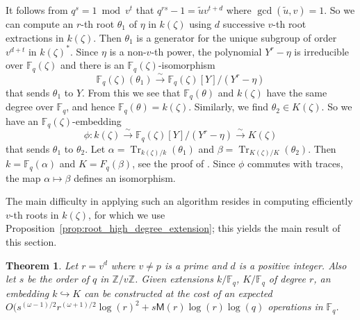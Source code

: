 \documentclass{mcom-l}
\theoremstyle{plain}
\newtheorem{theorem}{Theorem}
\theoremstyle{definition}
\DeclareMathOperator{\trace}{Tr} %
\newcommand{\Z}{\ensuremath{\mathbb{Z}}}
\newcommand{\F}{\ensuremath{\mathbb{F}}}
\newcommand{\MM}{\ensuremath{\mathsf{M}}}
\newcounter{algorithm}
\begin{document}
It follows from $q^s = 1 \bmod v^t$ that $q^{rs} - 1 = \tilde{u}v^{t + d}$ where $\gcd(\tilde{u}, 
v) = 1$. So we can compute an $r$-th root $\theta_1$ of $\eta$ in $k(\zeta)$ using $d$ successive 
$v$-th root extractions in $k(\zeta)$. Then $\theta_1$ is a generator for the unique subgroup of 
order $v^{d + t}$ in $k(\zeta)^*$. Since $\eta$ is a non-$v$-th power, the polynomial $Y^r - \eta$ 
is irreducible over $\F_q(\zeta)$ and there is an $\F_q(\zeta)$-isomorphism 
\[ \F_q(\zeta)(\theta_1) \xrightarrow{\sim} \F_q(\zeta)[Y] / (Y^r - \eta) \]
that sends $\theta_1$ to $Y$. From this we see that $\F_q(\theta)$ and $k(\zeta)$ have the same 
degree over $\F_q$, and hence $\F_q(\theta) = k(\zeta)$. Similarly, we find $\theta_2 \in 
K(\zeta)$. So we have an $\F_q(\zeta)$-embedding
\[ \phi: k(\zeta) \xrightarrow{\sim} \F_q(\zeta)[Y] / (Y^r - \eta) \xrightarrow{\sim} K(\zeta) \]
that sends $\theta_1$ to $\theta_2$. Let $\alpha = \trace_{k(\zeta) / k}(\theta_1)$ and $\beta = 
\trace_{K(\zeta) / K}(\theta_2)$. Then $k = \F_q(\alpha)$ and $K = F_q(\beta)$, see the proof of 
\cite[Theorem 2.1]{Shoup90}. Since $\phi$ commutes with traces, the map $\alpha\mapsto\beta$ 
defines an isomorphism.

The main difficulty in applying such an algorithm resides in computing
efficiently $v$-th roots in $k(\zeta)$, for which we use Proposition~\ref{prop:root_high_degree_extension};
this yields the main result of this section.
\begin{theorem}
	\label{theorem:isom-root}
	Let $r = v^d$ where $v \ne p$ is a prime and $d$ is a positive integer. Also let $s$ be the 
	order of $q$ in $\Z / v\Z$. Given extensions $k/\F_q$, $K/\F_q$ of degree $r$, an
        embedding $k\hookrightarrow K$ can be constructed at the cost of 
an expected $O(s^{(\omega-1)/2}r^{(\omega+1)/2}\log(r)^2 + s\MM(r)\log(r)\log(q)$
operations in $\F_q$.
\end{theorem}
\end{document}
